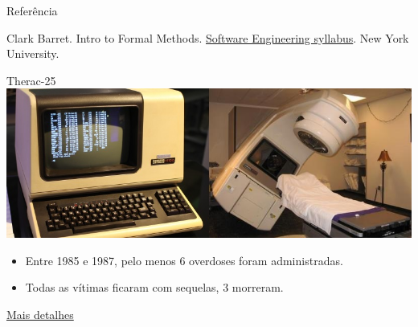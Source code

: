 
\frame{\title{\insertlecture}\maketitle}

\begin{frame}{Referência}
  \begin{thebibliography}{10}
    \beamertemplatebookbibitems
    Clark Barret.
    \newblock Intro to Formal Methods.
    \newblock \href{https://cs.nyu.edu/courses/spring08/V22.0474-001/syllabus.html}{Software Engineering syllabus}.
    \newblock New York University.
  \end{thebibliography}  
\end{frame}

\begin{frame}{Therac-25}
  \includegraphics[scale=.5]{therac25.png}
  \bigskip
  
  \begin{itemize}
  \item Entre 1985 e 1987, pelo menos 6 overdoses foram administradas.
  \item Todas as vítimas ficaram com sequelas, 3 morreram.
  \end{itemize}\bigskip

  \href{https://bit.ly/36DJCzi}{Mais detalhes}
  
\end{frame}

